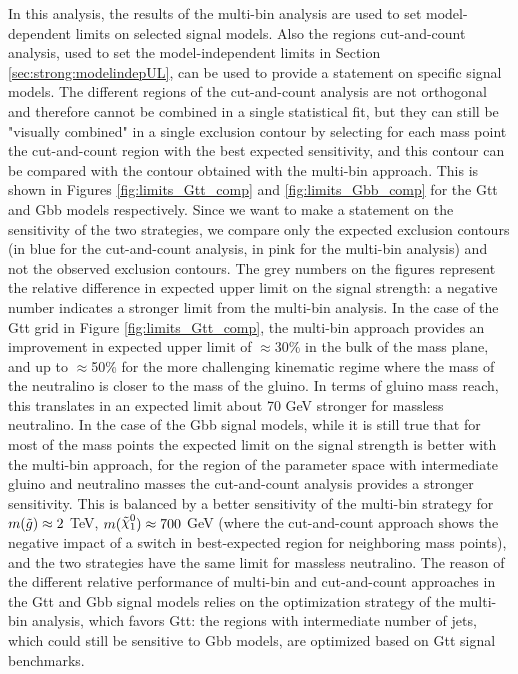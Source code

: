 In this analysis, the results of the multi-bin analysis are used to set model-dependent limits on selected signal models.
Also the regions cut-and-count analysis, used to set the model-independent limits in Section \ref{sec:strong:modelindepUL}, 
can be used to provide a statement on specific signal models. The different regions of the cut-and-count analysis are not orthogonal 
and therefore cannot be combined in a single statistical fit, but they can still be "visually combined" in a single exclusion contour 
by selecting for each mass point the cut-and-count region with the best expected sensitivity, and this contour can be compared 
with the contour obtained with the multi-bin approach.
This is shown in Figures \ref{fig:limits_Gtt_comp} and \ref{fig:limits_Gbb_comp} for the Gtt and Gbb models respectively.
Since we want to make a statement on the sensitivity of the two strategies, we compare only the expected exclusion contours 
(in blue for the cut-and-count analysis, in pink for the multi-bin analysis) and not the observed exclusion contours. 
The grey numbers on the figures represent the relative difference in expected upper limit on the signal strength: 
a negative number indicates a stronger limit from the multi-bin analysis. 
In the case of the Gtt grid in Figure \ref{fig:limits_Gtt_comp}, the multi-bin approach provides an improvement in 
expected upper limit of $\approx$30\% in the bulk of the mass plane, and up to $\approx$50\% for the more challenging 
kinematic regime where the mass of the neutralino is closer to the mass of the gluino.
In terms of gluino mass reach, this translates in an expected limit about 70 GeV stronger for massless neutralino.
In the case of the Gbb signal models, while it is still true that for most of the mass points the expected limit on the 
signal strength is better with the multi-bin approach, for the region of the parameter space with intermediate gluino and 
neutralino masses the cut-and-count analysis provides a stronger sensitivity.
This is balanced by a better sensitivity of the multi-bin strategy for $m(\tilde{g}) \approx 2$ TeV, $m(\ninoone) \approx 700$
GeV (where the cut-and-count approach shows the negative impact of a switch in best-expected region for neighboring mass points),
and the two strategies have the same limit for massless neutralino. 
The reason of the different relative performance of multi-bin and cut-and-count approaches in the Gtt and Gbb signal 
models relies on the optimization strategy of the multi-bin analysis, which favors Gtt: the regions with intermediate 
number of jets, which could still be sensitive to Gbb models, are optimized based on Gtt signal benchmarks.



